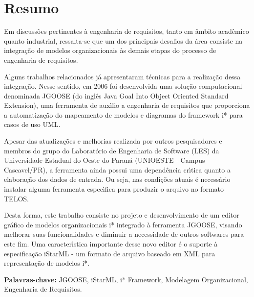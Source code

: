\chapter*{Resumo}
\noindent

Em discuss\~{o}es  pertinentes  \`{a}  engenharia de requisitos, tanto em \^{a}mbito
acad\^{e}mico quanto industrial, ressalta-se que um dos principais desafios da \'{a}rea
consiste na integra\c{c}\~{a}o de modelos organizacionais \`{a}s demais  etapas do processo
de engenharia de requisitos.

Alguns trabalhos relacionados j\'{a} apresentaram t\'{e}cnicas para a realiza\c{c}\~{a}o dessa integra\c{c}\~{a}o. Nesse sentido, em 2006 foi
desenvolvida uma solu\c{c}\~{a}o computacional denominada JGOOSE (do ingl\^{e}s  Java Goal Into Object  Oriented Standard Extension),
uma ferramenta de aux\'{\i}lio a engenharia de requisitos que proporciona a automatiza\c{c}\~{a}o do 
mapeamento de modelos e diagramas do  framework  i* para casos de uso UML.

Apesar das atualiza\c{c}\~{o}es e melhorias realizada por outros pesquisadores e membros
do grupo do Laborat\'{o}rio de Engenharia de Software (LES) da Universidade Estadual do Oeste do Paran\'{a} (UNIOESTE - Campus Cascavel/PR),
a ferramenta ainda possui uma depend\^{e}ncia cr\'{\i}tica quanto a elabora\c{c}\~{a}o dos dados de entrada.
Ou seja, nas condi\c{c}\~{o}es atuais \'{e} necess\'{a}rio instalar alguma ferramenta espec\'{\i}fica para produzir o arquivo no formato TELOS.

Desta forma, este trabalho consiste no projeto e desenvolvimento de um editor gr\'{a}fico de modelos organizacionais i* integrado  \`{a} ferramenta JGOOSE, visando melhorar
suas funcionalidades e diminuir a necessidade de outros softwares para este fim.
Uma caracter\'{\i}stica importante desse novo editor \'{e} o suporte \`{a} especifica\c{c}\~{a}o
iStarML - um formato de arquivo baseado em XML para representa\c{c}\~{a}o de modelos i*.


\vspace{1cm}

\noindent
\textbf{Palavras-chave: } JGOOSE, iStarML, i* Framework, Modelagem Organizacional, Engenharia de Requisitos.